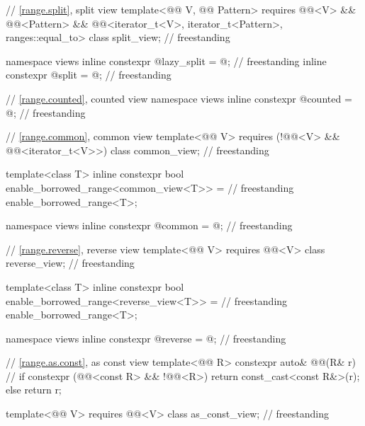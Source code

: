 \begin{codeblock}
{  // \ref{range.split}, split view
 template<@@ V, @@ Pattern>
   requires @@<V> && @@<Pattern> &&
            @@<iterator_t<V>, iterator_t<Pattern>, ranges::equal_to>
  class split_view;                                                                 // freestanding

  namespace views {
    inline constexpr @\unspecnc@ lazy_split = @\unspecnc@;                          // freestanding
    inline constexpr @\unspecnc@ split = @\unspecnc@;                               // freestanding
  }

  // \ref{range.counted}, counted view
  namespace views { inline constexpr @\unspecnc@ counted = @\unspecnc@; }           // freestanding

  // \ref{range.common}, common view
  template<@@ V>
    requires (!@@<V> && @@<iterator_t<V>>)
  class common_view;                                                                // freestanding

  template<class T>
    inline constexpr bool enable_borrowed_range<common_view<T>> =                   // freestanding
      enable_borrowed_range<T>;

  namespace views { inline constexpr @\unspecnc@ common = @\unspecnc@; }            // freestanding

  // \ref{range.reverse}, reverse view
  template<@@ V>
    requires @@<V>
  class reverse_view;                                                               // freestanding

  template<class T>
    inline constexpr bool enable_borrowed_range<reverse_view<T>> =                  // freestanding
      enable_borrowed_range<T>;

  namespace views { inline constexpr @\unspecnc@ reverse = @\unspecnc@; }           // freestanding

  // \ref{range.as.const}, as const view
  template<@@ R>
    constexpr auto& @@(R& r) {          // \expos
      if constexpr (@@<const R> && !@@<R>) {
        return const_cast<const R&>(r);
      } else {
        return r;
      }
    }

  template<@@ V>
    requires @@<V>
  class as_const_view;                                                              // freestanding

}
\end{codeblock}
